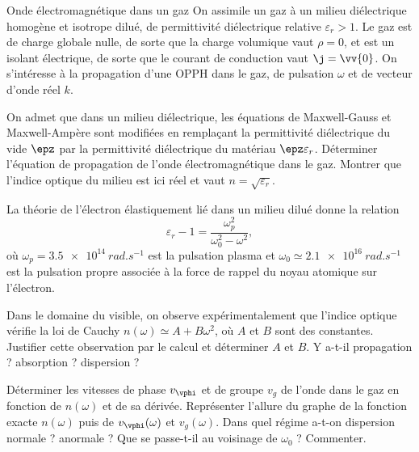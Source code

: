 \begin{exo}[PC][3][colle]{Onde électromagnétique dans un gaz}
  On assimile un gaz à un milieu diélectrique homogène et isotrope dilué, de permittivité diélectrique relative $\varepsilon_r >1$. Le gaz est de charge globale nulle, de sorte que la charge volumique vaut $\rho = 0$, et est un isolant électrique, de sorte que le courant de conduction vaut $\j = \vv{0}$.
   On s'intéresse à la propagation d'une OPPH dans le gaz, de pulsation $\omega$ et de vecteur d'onde réel $k$. 
  \begin{quest}
    \item On admet que dans un milieu diélectrique, les équations de Maxwell-Gauss et Maxwell-Ampère sont modifiées en remplaçant la permittivité diélectrique du vide $\epz$ par la permittivité diélectrique du matériau $\epz \varepsilon_r$. Déterminer l'équation de propagation de l'onde électromagnétique dans le gaz. Montrer que l'indice optique du milieu est ici réel et vaut $n=\sqrt{\varepsilon_r}$. 
  \end{quest}
    La théorie de l'électron élastiquement lié dans un milieu dilué donne la relation
    $$
    \varepsilon_r - 1 = \frac{\omega_p^2}{\omega_0^2-\omega^2},
    $$
    où $\omega_p=\SI{3.5e14}{rad.s^{-1}}$ est la pulsation plasma et $\omega_0 \simeq \SI{2.1e16}{rad.s^{-1}}$ est la pulsation propre associée à la force de rappel du noyau atomique sur l'électron.
    \begin{quest}
      \item	Dans le domaine du visible, on observe expérimentalement que l'indice optique vérifie la loi de Cauchy $n(\omega) \simeq  A + B \omega^2$, où $A$ et $B$ sont des constantes. Justifier cette observation par le calcul et déterminer $A$ et $B$. Y a-t-il propagation ? absorption ? dispersion ?
      \item Déterminer les vitesses de phase $v_{\vphi}$ et de groupe $v_g$ de l'onde dans le gaz en fonction de $n(\omega)$ et de sa dérivée. Représenter l'allure du graphe de la fonction exacte $n(\omega)$ puis de $v_{\vphi}(\omega)$ et $v_g(\omega)$. Dans quel régime a-t-on dispersion normale ? anormale ? Que se passe-t-il au voisinage de $\omega_0$ ? Commenter. 
      

\end{quest}
\end{exo}

